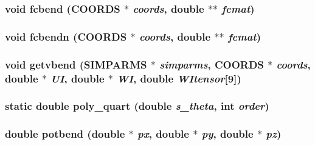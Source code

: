 \subsubsection{\setlength{\rightskip}{0pt plus 5cm}void fcbend ({\bf COORDS} $\ast$ {\em coords}, double $\ast$$\ast$ {\em fcmat})}\label{md__fbend_8c_0a3ba3189107950e0a57b59a991debfa}


\subsubsection{\setlength{\rightskip}{0pt plus 5cm}void fcbendn ({\bf COORDS} $\ast$ {\em coords}, double $\ast$$\ast$ {\em fcmat})}\label{md__fbend_8c_426667b9d7d5bd43b961b5ce8ac10172}


\subsubsection{\setlength{\rightskip}{0pt plus 5cm}void getvbend ({\bf SIMPARMS} $\ast$ {\em simparms}, {\bf COORDS} $\ast$ {\em coords}, double $\ast$ {\em UI}, double $\ast$ {\em WI}, double {\em WItensor}[9])}\label{md__fbend_8c_24324bed57f202b471a0b03cbe533403}


\subsubsection{\setlength{\rightskip}{0pt plus 5cm}static double poly\_\-quart (double {\em s\_\-theta}, int {\em order})\hspace{0.3cm}{\tt  [static]}}\label{md__fbend_8c_fa2ae79c673434ed8d94c2ae26775cae}


\subsubsection{\setlength{\rightskip}{0pt plus 5cm}double potbend (double $\ast$ {\em px}, double $\ast$ {\em py}, double $\ast$ {\em pz})}\label{md__fbend_8c_b710dbac6a907cfa5eb2cda66f8f8fc5}




